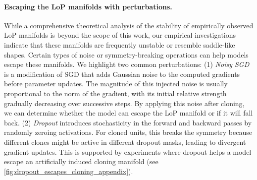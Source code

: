 \documentclass{article}
\numberwithin{figure}{section}
\begin{document}
\vspace{-7pt}
\paragraph{Escaping the LoP manifolds with perturbations.}
While a comprehensive theoretical analysis of the stability of empirically observed LoP manifolds is beyond the scope of this work, our empirical investigations indicate that these manifolds are frequently unstable or resemble saddle-like shapes.  Certain types of noise or symmetry-breaking operations can help models escape these manifolds. We highlight two common perturbations:
(1) \emph{Noisy SGD} is a modification of SGD that adds Gaussian noise to the computed gradients before parameter updates. The magnitude of this injected noise is usually proportional to the norm of the gradient, with its initial relative strength gradually decreasing over successive steps. By applying this noise after cloning, we can determine whether the model can escape the LoP manifold or if it will fall back. 
(2) \emph{Dropout} introduces stochasticity in the forward and backward passes by randomly zeroing activations. For cloned units, this breaks the symmetry because different clones might be active in different dropout masks, leading to divergent gradient updates. This is supported by experiments where dropout helps a model escape an artificially induced cloning manifold (see \cref{fig:dropout_escapes_cloning_appendix}).
\end{document}
